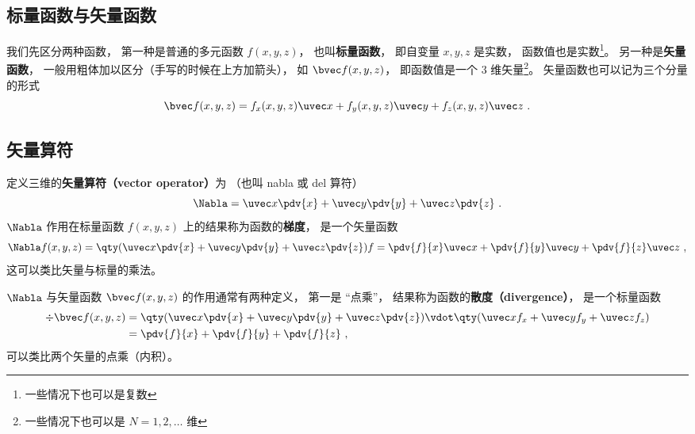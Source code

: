 

\subsection{标量函数与矢量函数}
我们先区分两种函数， 第一种是普通的多元函数 $f(x, y, z)$， 也叫\textbf{标量函数}， 即自变量 $x, y, z$ 是实数， 函数值也是实数\footnote{一些情况下也可以是复数}。 另一种是\textbf{矢量函数}， 一般用粗体加以区分（手写的时候在上方加箭头）， 如 $\bvec f(x, y, z)$， 即函数值是一个 3 维矢量\footnote{一些情况下也可以是 $N = 1, 2, \dots$ 维}。 矢量函数也可以记为三个分量的形式
\begin{equation}
\bvec f(x, y, z) = f_x(x, y, z) \uvec x + f_y(x, y, z) \uvec y + f_z(x, y, z) \uvec z~.
\end{equation}

\subsection{矢量算符}
定义三维的\textbf{矢量算符（vector operator）}为 （也叫 nabla 或 del 算符）
\begin{equation}
\Nabla = \uvec x \pdv{x} + \uvec y \pdv{y} + \uvec z \pdv{z}~.
\end{equation}
$\Nabla$ 作用在标量函数 $f(x, y, z)$ 上的结果称为函数的\textbf{梯度}， 是一个矢量函数
\begin{equation}\label{eq_VecOp_2}
\Nabla f(x, y, z) = \qty(\uvec x \pdv{x} + \uvec y \pdv{y} + \uvec z \pdv{z}) f = \pdv{f}{x} \uvec x + \pdv{f}{y} \uvec y + \pdv{f}{z} \uvec z~,
\end{equation}
这可以类比矢量与标量的乘法。

$\Nabla$ 与矢量函数 $\bvec f(x, y, z)$ 的作用通常有两种定义， 第一是 “点乘”， 结果称为函数的\textbf{散度（divergence）}， 是一个标量函数
\begin{equation}\label{eq_VecOp_1}
\begin{aligned}
\div \bvec f(x, y, z) &= \qty(\uvec x \pdv{x} + \uvec y \pdv{y} + \uvec z \pdv{z}) \vdot \qty(\uvec x f_x + \uvec y f_y + \uvec z f_z)\\
&= \pdv{f}{x} + \pdv{f}{y} + \pdv{f}{z}~,
\end{aligned}
\end{equation}
可以类比两个矢量的点乘（内积）。

